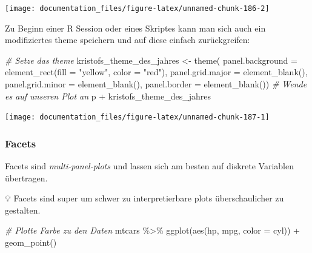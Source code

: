 \documentclass[
]{article}
\newenvironment{Shaded}{\begin{snugshade}}{\end{snugshade}}
\newcommand{\AttributeTok}[1]{\textcolor[rgb]{0.77,0.63,0.00}{#1}}
\newcommand{\CommentTok}[1]{\textcolor[rgb]{0.56,0.35,0.01}{\textit{#1}}}
\newcommand{\FunctionTok}[1]{\textcolor[rgb]{0.00,0.00,0.00}{#1}}
\newcommand{\NormalTok}[1]{#1}
\newcommand{\OtherTok}[1]{\textcolor[rgb]{0.56,0.35,0.01}{#1}}
\newcommand{\SpecialCharTok}[1]{\textcolor[rgb]{0.00,0.00,0.00}{#1}}
\newcommand{\StringTok}[1]{\textcolor[rgb]{0.31,0.60,0.02}{#1}}
\begin{document}
\begin{center}\texttt{[image: documentation\_files/figure-latex/unnamed-chunk-186-2]} \end{center}

Zu Beginn einer R Session oder eines Skriptes kann man sich auch ein modifiziertes theme speichern und auf diese einfach zurückgreifen:

\begin{Shaded}
\begin{Highlighting}[]
\CommentTok{\# Setze das theme}
\NormalTok{kristofs\_theme\_des\_jahres }\OtherTok{\textless{}{-}} \FunctionTok{theme}\NormalTok{(}
  \AttributeTok{panel.background =} \FunctionTok{element\_rect}\NormalTok{(}\AttributeTok{fill =} \StringTok{"yellow"}\NormalTok{, }\AttributeTok{color =} \StringTok{"red"}\NormalTok{),}
  \AttributeTok{panel.grid.major =} \FunctionTok{element\_blank}\NormalTok{(), }
  \AttributeTok{panel.grid.minor =} \FunctionTok{element\_blank}\NormalTok{(), }
  \AttributeTok{panel.border =} \FunctionTok{element\_blank}\NormalTok{())}
\CommentTok{\# Wende es auf unseren Plot an}
\NormalTok{p }\SpecialCharTok{+}\NormalTok{ kristofs\_theme\_des\_jahres}
\end{Highlighting}
\end{Shaded}

\begin{center}\texttt{[image: documentation\_files/figure-latex/unnamed-chunk-187-1]} \end{center}

\hypertarget{facets}{%
\subsubsection{Facets}\label{facets}}

Facets sind \emph{multi-panel-plots} und lassen sich am besten auf diskrete Variablen übertragen.

💡 Facets sind super um schwer zu interpretierbare plots überschaulicher zu gestalten.

\begin{Shaded}
\begin{Highlighting}[]
\CommentTok{\# Plotte Farbe zu den Daten}
\NormalTok{mtcars }\SpecialCharTok{\%\textgreater{}\%}
  \FunctionTok{ggplot}\NormalTok{(}\FunctionTok{aes}\NormalTok{(hp, mpg, }\AttributeTok{color =}\NormalTok{ cyl)) }\SpecialCharTok{+}
  \FunctionTok{geom\_point}\NormalTok{()}
\end{Highlighting}
\end{Shaded}
\end{document}
